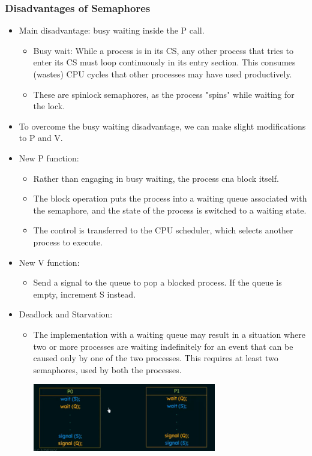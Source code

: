 \documentclass[10pt]{report}
\begin{document}
\subsubsection{Disadvantages of Semaphores}
\begin{itemize}
\item Main disadvantage: busy waiting inside the P call.
\begin{itemize}
\item Busy wait: While a process is in its CS, any other process that tries to enter its CS must loop continuously in its entry section. This consumes (wastes) CPU cycles that other processes may have used productively.
\item These are spinlock semaphores, as the process "spins" while waiting for the lock.
\end{itemize}
\item To overcome the busy waiting disadvantage, we can make slight modifications to P and V.
\item New P function:
\begin{itemize}
\item Rather than engaging in busy waiting, the process cna block itself.
\item The block operation puts the process into a waiting queue associated with the semaphore, and the state of the process is switched to a waiting state.
\item The control is transferred to the CPU scheduler, which selects another process to execute.
\end{itemize}
\item New V function:
\begin{itemize}
\item Send a signal to the queue to pop a blocked process. If the queue is empty, increment S instead.
\end{itemize}
\item Deadlock and Starvation:
\begin{itemize}
\item The implementation with a waiting queue may result in a situation where two or more processes are waiting indefinitely for an event that can be caused only by one of the two processes. This requires at least two semaphores, used by both the processes.
\begin{center}
    \includegraphics[width=8cm]{res/semaphores.png}
\end{center}
\end{itemize}
\end{itemize}
\end{document}
